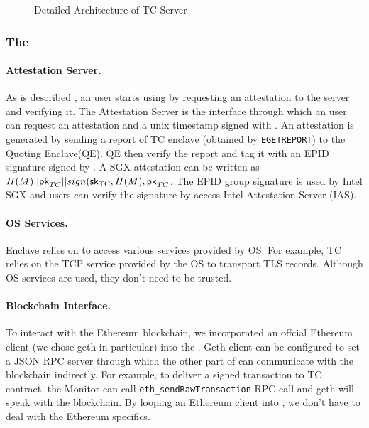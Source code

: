 \begin{figure}[h]
    \centering
    \caption{Detailed Architecture of TC Server}
    \label{fig:tcserver_impl}
\end{figure}

\subsubsection{The \medname}

\paragraph{Attestation Server.} As is described , an user starts
using \tc by requesting an attestation to the \tc server and verifying it.  The
Attestation Server is the interface through which an user can request an
attestation and a unix timestamp signed with \pkTC. An attestation is generated
by sending a report of TC enclave (obtained by \texttt{EGETREPORT}) to the Quoting Enclave(QE). 
QE then verify the report and tag it with an EPID signature signed by \sksgx. 
A SGX attestation can be written as $H(M) || {\sf pk}_{TC} || sign({\sf sk}_{\textrm{TC}}, H(M), {\sf pk}_{TC}$.
The EPID group signature is used by Intel SGX and users can verify the signature
by access Intel Attestation Server (IAS). 

\paragraph{OS Services.} Enclave relies on \medname to access various services 
provided by OS. For example, TC \medname relies on the TCP service provided by
the OS to transport TLS records. Although OS services are used, they don't need
to be trusted. 

\paragraph{Blockchain Interface.} To interact with the Ethereum blockchain, we
incorporated an offcial Ethereum client (we chose geth in particular) into the
\medname.  Geth client can be configured to set a JSON RPC server through which
the other part of \medname can communicate with the blockchain indirectly. 
For example, to deliver a signed transaction to TC contract, the Monitor can
call \texttt{eth\_sendRawTransaction} RPC call and geth will speak with the blockchain.
By looping an Ethereum client into \medname, we don't have to deal with the Ethereum
specifics.


